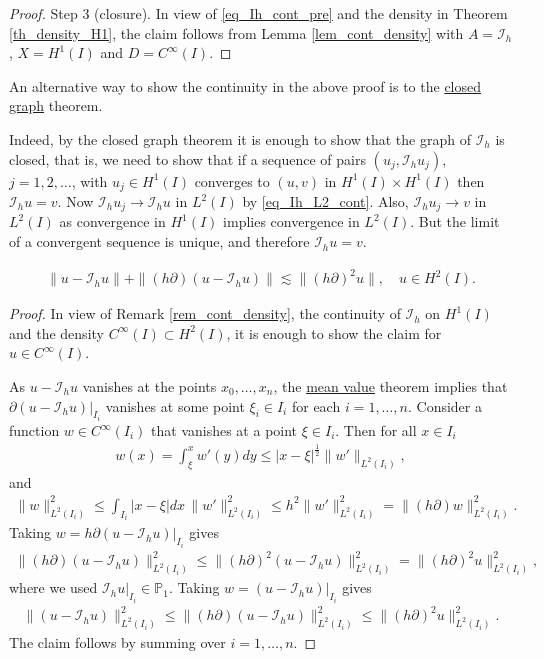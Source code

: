 \documentclass[12pt,oneside,final]{amsart}
\def\p{\partial}
\def\I{\mathcal I}
\begin{document}
\begin{proof}
Step 3 (closure).
In view of \eqref{eq_Ih_cont_pre} and the density in Theorem \ref{th_density_H1}, the claim follows from Lemma \ref{lem_cont_density}
with $A=\I_h$, $X = H^1(I)$ and $D = C^\infty(I)$.
\end{proof}

\begin{remark}
An alternative way to show the continuity in the above proof is to the \href{https://en.wikipedia.org/wiki/Closed_graph_theorem}{closed graph} theorem.
\end{remark}

Indeed, by the closed graph theorem it is enough to show that the graph of $\I_h$ is closed, that is, we need to show that if a sequence of pairs $(u_j, \I_h u_j)$, $j=1,2,\dots$,
with $u_j \in H^1(I)$ converges to $(u, v)$ in $H^1(I) \times H^1(I)$ then $\I_h u = v$.
Now $\I_h u_j \to \I_h u$ in $L^2(I)$ by \eqref{eq_Ih_L2_cont}.
Also, $\I_h u_j \to v$ in $L^2(I)$ as convergence in $H^1(I)$ implies convergence in $L^2(I)$. But the limit of a convergent sequence is unique, and therefore $\I_h u = v$.

\begin{theorem}\label{th_interp}
    \begin{align*}
\|u - \I_h u\| + \|(h\p)(u - \I_h u)\| \lesssim \|(h\p)^2 u\|, 
\quad u \in H^2(I). 
    \end{align*}
\end{theorem}
\begin{proof}
In view of Remark \ref{rem_cont_density},
the continuity of $\I_h$ on $H^1(I)$ and the density $C^\infty(I) \subset H^2(I)$, it is enough to show the claim for $u \in C^\infty(I)$.

As $u - \I_h u$ vanishes at the points $x_0, \dots, x_n$,
the \href{https://en.wikipedia.org/wiki/Mean_value_theorem}{mean value} theorem implies that $\p (u - \I_h u)|_{I_i}$ vanishes at some point $\xi_i \in I_i$ for each $i=1,\dots,n$.
Consider a function $w \in C^\infty(I_i)$ that vanishes at a point $\xi \in I_i$. Then for all $x \in I_i$
    \begin{align*}
w(x) = \int_\xi^x w'(y) dy \le |x - \xi|^{\frac12} \|w'\|_{L^2(I_i)},
    \end{align*}
and
    \begin{align*}
\|w\|_{L^2(I_i)}^2 \le \int_{I_i} |x - \xi| dx\, \|w'\|_{L^2(I_i)}^2
\le h^2 \|w'\|_{L^2(I_i)}^2 = \|(h\p) w\|_{L^2(I_i)}^2.
    \end{align*}
Taking $w = h\p (u - \I_h u)|_{I_i}$ gives 
    \begin{align*}
\|(h\p)(u - \I_h u)\|_{L^2(I_i)}^2 
\le 
\|(h\p)^2 (u - \I_h u)\|_{L^2(I_i)}^2
= 
\|(h\p)^2 u\|_{L^2(I_i)}^2,
    \end{align*}
where we used $\I_h u|_{I_i} \in \mathbb P_1$.
Taking $w = (u - \I_h u)|_{I_i}$ gives
    \begin{align*}
\|(u - \I_h u)\|_{L^2(I_i)}^2 
\le 
\|(h\p)(u - \I_h u)\|_{L^2(I_i)}^2
\le 
\|(h\p)^2 u\|_{L^2(I_i)}^2.
    \end{align*}
The claim follows by summing over $i=1,\dots,n$.
\end{proof}
\end{document}
